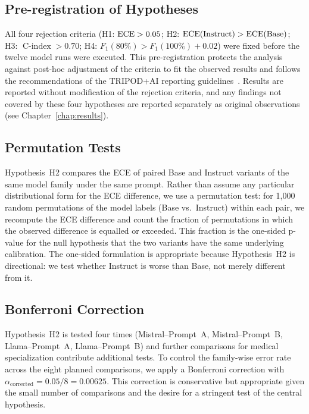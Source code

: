 \subsection{Pre-registration of Hypotheses}
\label{subsec:met-preregistration}

All four rejection criteria (H1: $\textrm{ECE} > 0.05$; H2: 
$\textrm{ECE}(\text{Instruct}) > \textrm{ECE}(\text{Base})$; H3: 
$\operatorname{C-index} > 0.70$; H4: $F_1(80\%) > F_1(100\%) + 0.02$) 
were fixed before the twelve model runs were executed. This 
pre-registration protects the analysis against post-hoc adjustment of 
the criteria to fit the observed results and follows the recommendations 
of the TRIPOD+AI reporting guidelines~\cite{collins2024tripod}. Results 
are reported without modification of the rejection criteria, and any 
findings not covered by these four hypotheses are reported separately as 
original observations (see Chapter~\ref{chap:results}).

\subsection{Permutation Tests}
\label{subsec:met-permutation}

Hypothesis~H2 compares the ECE of paired Base and Instruct variants of 
the same model family under the same prompt. Rather than assume any 
particular distributional form for the ECE difference, we use a 
permutation test: for 1{,}000 random permutations of the model labels 
(Base vs.\ Instruct) within each pair, we recompute the ECE difference 
and count the fraction of permutations in which the observed difference 
is equalled or exceeded. This fraction is the one-sided p-value for the 
null hypothesis that the two variants have the same underlying 
calibration. The one-sided formulation is appropriate because 
Hypothesis~H2 is directional: we test whether Instruct is worse than 
Base, not merely different from it.

\subsection{Bonferroni Correction}
\label{subsec:met-bonferroni}

Hypothesis~H2 is tested four times (Mistral--Prompt~A, Mistral--Prompt~B, 
Llama--Prompt~A, Llama--Prompt~B) and further comparisons for medical 
specialization contribute additional tests. To control the family-wise 
error rate across the eight planned comparisons, we apply a Bonferroni 
correction with $\alpha_{\text{corrected}} = 0.05 / 8 = 0.00625$. This 
correction is conservative but appropriate given the small number of 
comparisons and the desire for a stringent test of the central 
hypothesis.

